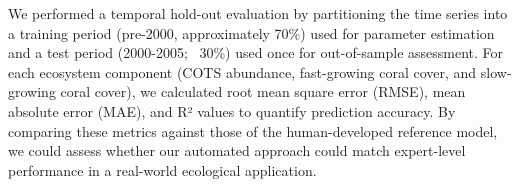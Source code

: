 We performed a temporal hold-out evaluation by partitioning the time series into a training period (pre-2000, approximately 70\%) used for parameter estimation and a test period (2000-2005; ~30\%) used once for out-of-sample assessment. For each ecosystem component (COTS abundance, fast-growing coral cover, and slow-growing coral cover), we calculated root mean square error (RMSE), mean absolute error (MAE), and R² values to quantify prediction accuracy. By comparing these metrics against those of the human-developed reference model, we could assess whether our automated approach could match expert-level performance in a real-world ecological application.
